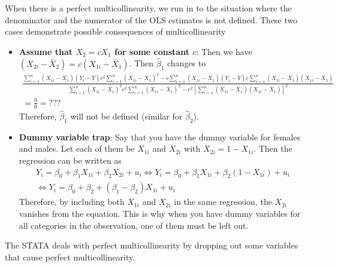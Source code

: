 \documentclass[12pt]{article}
\theoremstyle{definition}
\theoremstyle{property}
\theoremstyle{assumption}
\theoremstyle{example}
\theoremstyle{comment}
\begin{document}
When there is a perfect multicollinearity, we run in to the situation where the denominator and the numerator of the OLS estimates is not defined. These two cases demonstrate possible consequences of multicollinearity
\begin{itemize}
\item \textbf{Assume that $X_2 = cX_1$ for some constant $c$}: Then we have $(X_{2i}-\bar{X}_2)=c(X_{1i}-\bar{X}_1)$. Then $\hat{\beta}_1$ changes to
\scriptsize{\begin{gather*}
\frac{\sum_{i=1}^n (X_{1i}-\bar{X}_1)(Y_{i}-\bar{Y})c^2\sum_{i=1}^n(X_{1i}-\bar{X}_1)^2-c\sum_{i=1}^n (X_{1i}-\bar{X}_1)(Y_{i}-\bar{Y})c\sum_{i=1}^n(X_{1i}-\bar{X}_1)(X_{1i}-\bar{X}_1)}{\sum_{i=1}^n (X_{1i}-\bar{X}_1)^2 c^2\sum_{i=1}^n (X_{1i}-\bar{X}_1)^2-c^2[\sum_{i=1}^n (X_{1i}-\bar{X}_1)(X_{1i}-\bar{X}_1)]^2} \\
=\frac{0}{0} = ???
\end{gather*}}\normalsize
Therefore, $\hat{\beta}_1$ will not be defined (similar for $\hat{\beta}_2$).
\item \textbf{Dummy variable trap}: Say that you have the dummy variable for females and males. Let each of them be $X_{1i}$ and $X_{2i}$ with $X_{2i}=1-X_{1i}$. Then the regression can be written as
\begin{gather*}
Y_i = \beta_0 + \beta_1X_{1i} + \beta_2X_{2i} + u_i \iff Y_i = \beta_0 + \beta_1X_{1i} + \beta_2(1-X_{1i}) + u_i \\
\iff Y_i = \beta_0 + \beta_2 +(\beta_1-\beta_2)X_{1i}+u_i
\end{gather*}
Therefore, by including both $X_{1i}$ and $X_{2i}$ in the same regression, the $X_{2i}$ vanishes from the equation. This is why when you have dummy variables for all categories in the observation, one of them must be left out.
\end{itemize} \par\medskip
The STATA deals with perfect multicollinearity by dropping out some variables that cause perfect multicollinearity.

\end{document}
